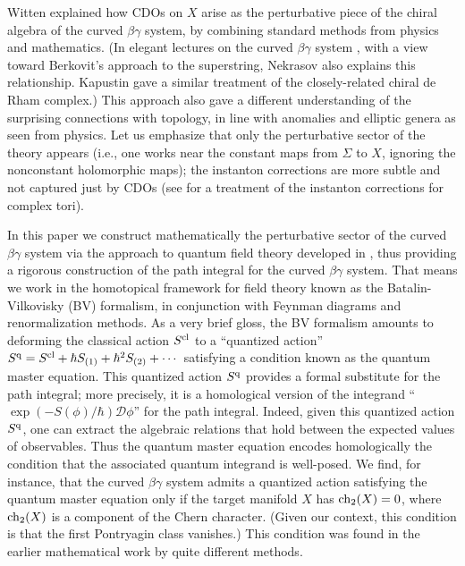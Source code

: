 Witten \cite{WittenCDO} explained how CDOs on $X$ arise as the perturbative piece of the chiral algebra of the curved $\beta\gamma$ system, by combining standard methods from physics and mathematics. (In elegant lectures on the curved $\beta\gamma$ system \cite{Nek}, with a view toward Berkovit's approach to the superstring, Nekrasov also explains this relationship.  Kapustin \cite{KapCDR} gave a similar treatment of the closely-related chiral de Rham complex.) This approach also gave a different understanding of the surprising connections with topology, in line with anomalies and elliptic genera as seen from physics. Let us emphasize that only the perturbative sector of the theory appears (i.e., one works near the constant maps from $\Sigma$ to $X$, ignoring the nonconstant holomorphic maps); the instanton corrections are more subtle and not captured just by CDOs (see \cite{KapOrlov} for a treatment of the instanton corrections for complex tori).

In this paper we construct mathematically the perturbative sector of the curved $\beta\gamma$ system via the approach to quantum field theory developed in \cite{CosBook, CG1, CG2}, thus providing a rigorous construction of the path integral for the curved $\beta\gamma$ system. That means we work in the homotopical framework for field theory known as the Batalin-Vilkovisky (BV) formalism, in conjunction with Feynman diagrams and renormalization methods. As a very brief gloss, the BV formalism amounts to deforming the classical action $S^{\rm cl}$ to a ``quantized action'' $S^{\rm q} = S^{\rm cl} + \hbar S_{(1)} + \hbar^2 S_{(2)} + \cdots$ satisfying a condition known as the quantum master equation. This quantized action $S^{\rm q}$ provides a formal substitute for the path integral; more precisely, it is a homological version of the integrand ``$\exp(-S(\phi)/\hbar) \mathcal{D}\phi$'' for the path integral. Indeed, given this quantized action $S^{\rm q}$, one can extract the algebraic relations that hold between the expected values of observables. Thus the quantum master equation encodes homologically the condition that the associated quantum integrand is well-posed. We find, for instance, that the curved $\beta\gamma$ system admits a quantized action satisfying the quantum master equation only if the target manifold $X$ has ${\rm ch}_2(X) = 0$, where ${\rm ch}_2(X)$ is a component of the Chern character. (Given our context, this condition is that the first Pontryagin class vanishes.) This condition was found in the earlier mathematical work by quite different methods.

